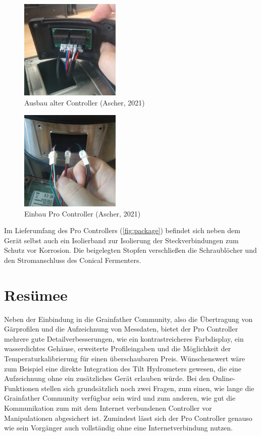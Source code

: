 \documentclass[a4paper,parskip=half]{scrartcl}
\begin{document}
\begin{figure}[H]
\centering
\includegraphics[width=4.8cm]{images/gfpc_install_old.jpg}
\caption{Ausbau alter Controller (Ascher, 2021)}
\label{fig:installold}
\end{figure}

\begin{figure}[H]
\centering
\includegraphics[width=4.8cm]{images/gfpc_install_new.jpg}
\caption{Einbau Pro Controller (Ascher, 2021)}
\label{fig:installnew}
\end{figure}

Im Lieferumfang des Pro Controllers (\autoref{fig:package})
befindet sich neben dem Gerät selbst auch ein Isolierband
zur Isolierung der Steckverbindungen zum Schutz vor
Korrosion. Die beigelegten Stopfen verschließen die
Schraublöcher und den Stromanschluss des Conical Fermenters.

\section*{Resümee}

Neben der Einbindung in die Grainfather Community, also die
Übertragung von Gärprofilen und die Aufzeichnung von
Messdaten, bietet der Pro Controller mehrere gute
Detailverbesserungen, wie ein kontrastreicheres Farbdisplay,
ein wasserdichtes Gehäuse, erweiterte Profileingaben und
die Möglichkeit der Temperaturkalibrierung für einen
überschaubaren Preis. Wünschenswert wäre zum Beispiel
eine direkte Integration des Tilt Hydrometers
gewesen, die eine Aufzeichnung ohne ein zusätzliches
Gerät erlauben würde. Bei den Online-Funktionen stellen sich
grundsätzlich noch zwei Fragen, zum einen, wie lange die
Grainfather Community verfügbar sein wird und zum anderen, wie
gut die Kommunikation zum mit dem Internet verbundenen Controller
vor Manipulationen abgesichert ist. Zumindest lässt sich der Pro
Controller genauso wie sein Vorgänger auch vollständig ohne eine
Internetverbindung nutzen.
\end{document}
